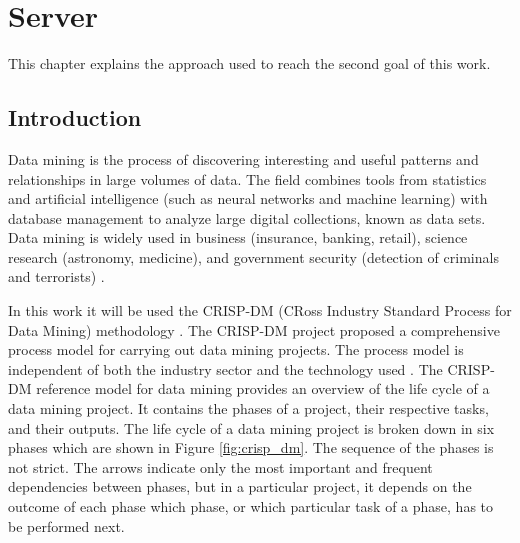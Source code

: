 % 
%  
%
\chapter{Server}
\label{cha:server}
This chapter explains the approach used to reach the second goal of this work. 

\section{Introduction} %
\label{sec:introduction}
Data mining is the process of discovering interesting and useful patterns and relationships in large volumes of data. The field combines tools from statistics and artificial intelligence (such as neural networks and machine learning) with database management to analyze large digital collections, known as data sets. Data mining is widely used in business (insurance, banking, retail), science research (astronomy, medicine), and government security (detection of criminals and terrorists) \cite{Okonkwo2011COMBATINGCA}. 

In this work it will be used the CRISP-DM (CRoss Industry Standard Process for Data Mining) methodology \cite{CRISPDM}.
The CRISP-DM project proposed a comprehensive process model for carrying out data mining projects. The process model is independent of both the industry sector and the technology used \cite{CRISPDM}. 
The CRISP-DM reference model for data mining provides an overview of the life cycle of a data
mining project. It contains the phases of a project, their respective tasks, and their outputs.
The life cycle of a data mining project is broken down in six phases which are shown in Figure \ref{fig:crisp_dm}.
The sequence of the phases is not strict. The arrows indicate only the most important and frequent
dependencies between phases, but in a particular project, it depends on the outcome of each phase
which phase, or which particular task of a phase, has to be performed next.


